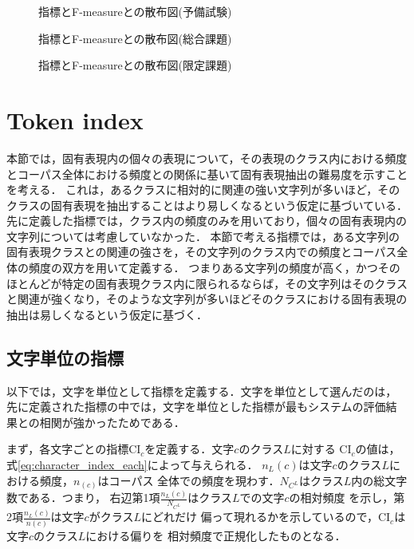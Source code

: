 \begin{figure}[hb]\small
\begin{center}
\end{center}
\caption{\label{figure:scatter_diagram_dryrun}指標とF-measureとの散布図(予備試験)}
\end{figure}
\begin{figure}[htp]\small
\begin{center}
\end{center}
\caption{\label{figure:scatter_diagram_general}指標とF-measureとの散布図(総合課題)}
\begin{center}
\end{center}
\caption{\label{figure:scatter_diagram_arrest}指標とF-measureとの散布図(限定課題)}
\end{figure}

\newpage
\section{\label{section:TI}Token index}

本節では，固有表現内の個々の表現について，その表現のクラス内における頻度とコーパス全体における頻度との関係に基いて固有表現抽出の難易度を示すことを考える．
これは，あるクラスに相対的に関連の強い文字列が多いほど，そのクラスの固有表現を抽出することはより易しくなるという仮定に基づいている．
先に定義した指標では，クラス内の頻度のみを用いており，個々の固有表現内の文字列については考慮していなかった．
本節で考える指標では，ある文字列の固有表現クラスとの関連の強さを，その文字列のクラス内での頻度とコーパス全体の頻度の双方を用いて定義する．
つまりある文字列の頻度が高く，かつそのほとんどが特定の固有表現クラス内に限られるならば，その文字列はそのクラスと関連が強くなり，そのような文字列が多いほどそのクラスにおける固有表現の抽出は易しくなるという仮定に基づく．

\subsection{\label{subsec:CI}文字単位の指標}

以下では，文字を単位として指標を定義する．文字を単位として選んだのは，
先に定義された指標の中では，文字を単位とした指標が最もシステムの評価結
果との相関が強かったためである．

まず，各文字ごとの指標CI$_c$を定義する．文字\(c\)のクラス\(L\)に対する
CI$_c$の値は，式\ref{eq:character_index_each}によって与えられる．
\(n_L(c)\)は文字\(c\)のクラス\(L\)における頻度，\(n_{(c)}\)はコーパス
全体での頻度を現わす．\(N_{C^L}\)はクラス\(L\)内の総文字数である．つまり，
右辺第1項\(\frac{n_L(c)}{N_{C^L}}\)はクラス\(L\)での文字\(c\)の相対頻度
を示し，第2項\(\frac{n_L(c)}{n(c)}\)は文字\(c\)がクラス\(L\)にどれだけ
偏って現れるかを示しているので，CI\(_c\)は文字\(c\)のクラス\(L\)における偏りを
相対頻度で正規化したものとなる．

